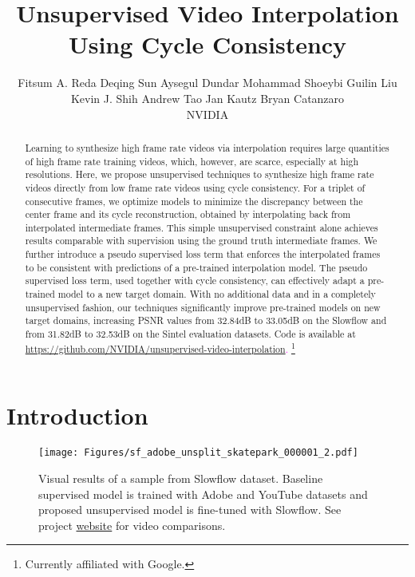 \documentclass[10pt,twocolumn,letterpaper]{article}
\newcommand\blfootnote[1]{\begingroup
  \renewcommand\thefootnote{}\footnote{#1}\addtocounter{footnote}{-1}\endgroup
}
\begin{document}
\title{Unsupervised Video Interpolation Using Cycle Consistency}

\author{Fitsum A. Reda \quad Deqing Sun \quad Aysegul Dundar \quad Mohammad Shoeybi \quad Guilin Liu\\ Kevin J. Shih \quad Andrew Tao \quad Jan Kautz \quad Bryan Catanzaro\\
NVIDIA} 

\maketitle
\thispagestyle{empty}


\begin{abstract}

Learning to synthesize high frame rate videos via interpolation requires large quantities of high frame rate training videos, which, however, are scarce, especially at high resolutions. Here, we propose unsupervised techniques to synthesize high frame rate videos directly from low frame rate videos using cycle consistency. For a triplet of consecutive frames, we optimize models to minimize the discrepancy between the center frame and its cycle reconstruction, obtained by interpolating back from interpolated intermediate frames. This simple unsupervised constraint alone achieves results comparable with supervision using the ground truth intermediate frames. We further introduce a pseudo supervised loss term that enforces the interpolated frames to be consistent with predictions of a pre-trained interpolation model. The pseudo supervised loss term, used together with cycle consistency, can effectively adapt a pre-trained model to a new target domain. With no additional data and in a completely unsupervised fashion, our techniques significantly improve pre-trained models on new target domains, increasing PSNR values from 32.84dB to 33.05dB on the Slowflow and from 31.82dB to 32.53dB on the Sintel evaluation datasets. Code is available at \textcolor{magenta}{\href{https://github.com/NVIDIA/unsupervised-video-interpolation}{https://github.com/NVIDIA/unsupervised-video-interpolation}.} \blfootnote{Currently affiliated with Google.}


\end{abstract}

\section{Introduction}

 \begin{figure}[t]
    \centering
    \texttt{[image: Figures/sf\_adobe\_unsplit\_skatepark\_000001\_2.pdf]}
    \caption{Visual results of a sample from Slowflow dataset. Baseline supervised model is trained with Adobe and YouTube datasets and proposed unsupervised model is fine-tuned with Slowflow. See project \textcolor{magenta}{\href{https://nv-adlr.github.io/publication/2019-UnsupervisedVideoInterpolation}{website}} for video comparisons.}
    \label{fig:Front_page_figure_slowflow}
\end{figure}
\end{document}
